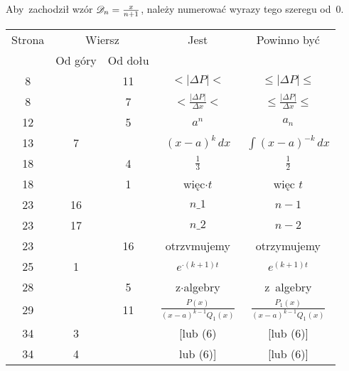 \documentclass[a4paper,11pt]{article}
\begin{document}
\vspace{\spaceFour}





\noindent
{} Aby~zachodził wzór $\mathcal{D}_{ n } = \tfrac{ x }{ n + 1 }$,
należy numerować wyrazy tego szeregu od~0.

\vspace{\spaceFour}





\newpage



\begin{center}

  \begin{tabular}{|c|c|c|c|c|}
    \hline
    Strona & \multicolumn{2}{c|}{Wiersz} & Jest
                              & Powinno być \\ \cline{2-3}
    & Od góry & Od dołu & & \\
    \hline
    \hphantom{0}8 & & 11 & $< | \Delta P | <$ & $\leq | \Delta P | \leq$ \\[0.2em]
    \hphantom{0}8 & & \hphantom{0}7 & $< \frac{ | \Delta P | }{ \Delta x } <$
           & $\leq \frac{ | \Delta P | }{ \Delta x } \leq$ \\[0.2em]
    12 & & \hphantom{0}5 & $a^{ n }$ & $a_{ n }$ \\
    13 & \hphantom{0}7 & & $( x - a )^{ k } \, dx$
    & $\int ( x - a )^{ -k } \, dx$ \\
    18 & & \hphantom{0}4 & $\frac{ 1 }{ 3 }$ & $\frac{ 1 }{ 2 }$ \\
    18 & & \hphantom{0}1 & więc$\cdot t$ & więc $t$ \\
    23 & 16 & & $n \_ 1$ & $n - 1$ \\
    23 & 17 & & $n \_ 2$ & $n - 2$ \\
    23 & & 16 & otrzvmujemy & otrzymujemy \\
    25 & \hphantom{0}1 & & $e^{ \cdot ( k + 1 ) t}$ & $e^{ ( k + 1 ) t}$ \\
    28 & & \hphantom{0}5 & z$\cdot$algebry & z~algebry \\[0.2em]
    29 & & 11 & $\frac{ P( x ) }{ ( x - a )^{ k - 1 } Q_{ 1 }( x ) }$
           & $\frac{ P_{ 1 }( x ) }{ ( x - a )^{ k - 1 } Q_{ 1 }( x ) }$ \\
    34 & \hphantom{0}3 & & [lub (6) & [lub (6)] \\
    34 & \hphantom{0}4 & & lub (6)] & [lub (6)] \\

\end{tabular}
\end{center}
\end{document}
